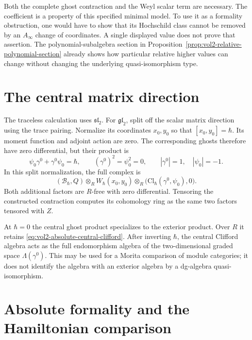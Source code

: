 Both the complete ghost contraction and the Weyl scalar term
are necessary. The coefficient is a property of this specified
minimal model. To use it as a formality obstruction, one would
have to show that its Hochschild class cannot be removed by
an $A_\infty$ change of coordinates. A single displayed value
does not prove that assertion.
The polynomial-subalgebra section in
Proposition~\ref{prop:vol2-relative-polynomial-section}
already shows how particular relative higher values can change
without changing the underlying quasi-isomorphism type.

\section{The central matrix direction}
\label{sec:vol2-absolute-central-direction}

The traceless calculation uses $\mathfrak{sl}_2$.
For $\mathfrak{gl}_2$, split off the scalar matrix direction
using the trace pairing. Normalize its coordinates $x_0,y_0$
so that $[x_0,y_0]=\hbar$.
Its moment function and adjoint action are zero.
The corresponding ghosts therefore have zero differential,
but their product is
\begin{equation}\label{eq:vol2-absolute-central-clifford}
 \psi_0\gamma^0+\gamma^0\psi_0=\hbar,
 \qquad (\gamma^0)^2=\psi_0^2=0,
 \qquad |\gamma^0|=1,\quad |\psi_0|=-1.
\end{equation}
In this split normalization, the full complex is
\[
 (\mathcal B_\hbar,Q)\otimes_R W_\hbar(x_0,y_0)
       \otimes_R\bigl(\mathrm{Cl}_\hbar(\gamma^0,\psi_0),0\bigr).
\]
Both additional factors are $R$-free with zero differential.
Tensoring the constructed contraction computes its cohomology
ring as the same two factors tensored with $Z$.

At $\hbar=0$ the central ghost product specializes to the
exterior product. Over $R$ it retains
\eqref{eq:vol2-absolute-central-clifford}.
After inverting $\hbar$, the central Clifford algebra acts as
the full endomorphism algebra of the two-dimensional graded
space $\Lambda(\gamma^0)$.
This may be used for a Morita comparison of module categories;
it does not identify the algebra with an exterior algebra by
a dg-algebra quasi-isomorphism.

\section{Absolute formality and the Hamiltonian comparison}
\label{sec:vol2-absolute-remaining-comparison}

